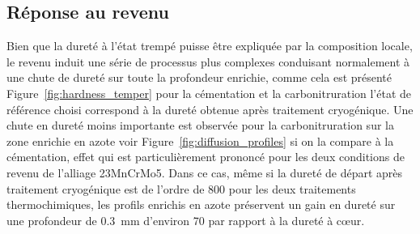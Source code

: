 \subsection{Réponse au revenu}

Bien que la dureté à l'état trempé puisse être expliquée par la composition locale, le revenu induit une série de processus plus complexes conduisant normalement à une chute de dureté sur toute la profondeur enrichie, comme cela est présenté Figure~\ref{fig:hardness_temper} pour la cémentation et la carbonitruration \textemdash{} l'état de référence choisi correspond à la dureté obtenue après traitement cryogénique. Une chute en dureté moins importante est observée pour la carbonitruration sur la zone enrichie en azote \textendash{} voir Figure~\ref{fig:diffusion_profiles} \textendash{} si on la compare à la cémentation, effet qui est particulièrement prononcé pour les deux conditions de revenu de l'alliage 23MnCrMo5. Dans ce cas, même si la dureté de départ \textendash{} après traitement cryogénique \textendash{} est de l'ordre de \SI{800}{\HV} pour les deux traitements thermochimiques, les profils enrichis en azote préservent un gain en dureté sur une profondeur de \SI{0,3}{\milli\metre} d'environ \SI{70}{\HV} par rapport à la dureté à c{\oe}ur.

